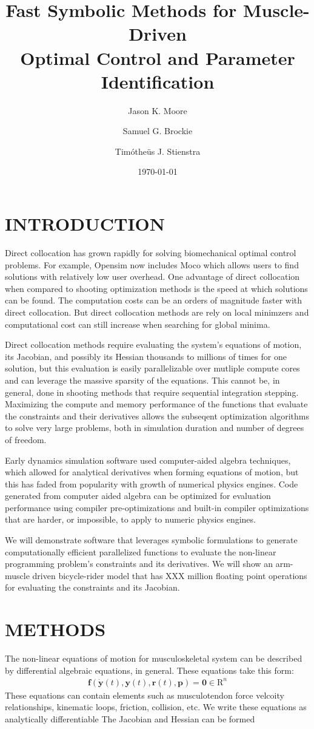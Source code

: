 \documentclass[11pt,twocolumn]{article}
\title{Fast Symbolic Methods for Muscle-Driven\\Optimal Control and Parameter
Identification}
\author{Jason K. Moore \and Samuel G. Brockie \and Timótheüs J. Stienstra}
\date{\today}
\begin{document}
\maketitle
\section*{INTRODUCTION}
%
Direct collocation has grown rapidly for solving biomechanical optimal control
problems. For example, Opensim now includes Moco which allows users to find
solutions with relatively low user overhead. One advantage of direct
collocation when compared to shooting optimization methods is the speed at
which solutions can be found. The computation costs can be an orders of
magnitude faster with direct collocation. But direct collocation methods are
rely on local minimzers and computational cost can still increase when
searching for global minima.

Direct collocation methods require evaluating the system's equations of motion,
its Jacobian, and possibly its Hessian thousands to millions of times for one
solution, but this evaluation is easily parallelizable over mutliple compute
cores and can leverage the massive sparsity of the equations. This cannot be,
in general, done in shooting methods that require sequential integration
stepping. Maximizing the compute and memory performance of the functions that
evaluate the constraints and their derivatives allows the subseqent
optimization algorithms to solve very large problems, both in simulation
duration and number of degrees of freedom.

Early dynamics simulation software used computer-aided algebra techniques,
which allowed for analytical derivatives when forming equations of motion, but
this has faded from popularity with growth of numerical physics engines. Code
generated from computer aided algebra can be optimized for evaluation
performance using compiler pre-optimizations and built-in compiler
optimizations that are harder, or impossible, to apply to numeric physics
engines.

We will demonstrate software that leverages symbolic formulations to generate
computationally efficient parallelized functions to evaluate the non-linear
programming problem's constraints and its derivatives. We will show an
arm-muscle driven bicycle-rider model that has XXX million floating point
operations for evaluating the constraints and its Jacobian.

\section*{METHODS}
%
The non-linear equations of motion for musculoskeletal system can be described
by differential algebraic equations, in general. These equations take this
form:
%
\begin{align}
  \mathbf{f}(\dot{\mathbf{y}}(t), \mathbf{y}(t), \mathbf{r}(t), \mathbf{p}) =
  \mathbf{0} \in \mathrm{R}^n
\end{align}
%
These equations can contain elements such as musculotendon force velcoity
relationships, kinematic loops, friction, collision, etc. We write these
equations as analytically differentiable The Jacobian and
Hessian can be formed
\end{document}
